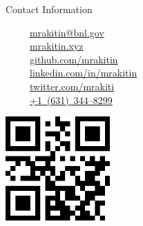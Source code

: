\documentclass[final]{beamer}
\newlength{\onecolwid}
\newcommand{\colorify}[1]{\textcolor{linkcolor}{#1}}
\newcommand{\mylinkn}[2]{\href{#1}{\colorify{#2}}}
\newcommand{\mylinkm}[1]{\href{mailto:#1?subject=Your poster at 2017 NSLS-II and CFN Users' Meeting}{\colorify{#1}}}
\newcommand{\mylinkt}[1]{\href{tel:#1}{#1}}
\begin{document}
\begin{frame}[t]
\begin{columns}[t]
\begin{column}{\onecolwid}

\begin{alertblock}{\faSendO{} Contact Information}

~~~\faEnvelopeO~~\mylinkm{mrakitin@bnl.gov} \\
~~~\faGlobe~~\mylinkn{https://mrakitin.xyz}{mrakitin.xyz} \\
~~~\faGithub~~\mylinkn{https://github.com/mrakitin}{github.com/mrakitin} \\
~~~\faLinkedinSquare~~\mylinkn{https://www.linkedin.com/in/mrakitin}{linkedin.com/in/mrakitin} \\
~~~\faTwitter~~\mylinkn{https://twitter.com/mrakiti}{twitter.com/mrakiti} \\
~~~\faPhone~~\mylinkt{+1~(631)~344--8299} \\

\end{alertblock}


\begin{minipage}[t]{0.25\linewidth}
\href{http://sirepo.com}{\includegraphics[height=4.0cm]{images/qr_sirepo.png}}
\end{minipage}


\end{column} %

\end{columns} %

\end{frame} %
\end{document}
